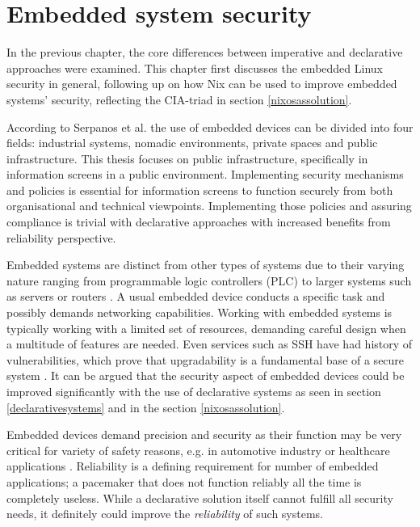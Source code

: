 \chapter{Embedded system security} \label{embedded}

In the previous chapter, the core differences between imperative and
declarative approaches were examined. This chapter first discusses
the embedded Linux security in general, following up on how Nix can be
used to improve embedded systems' security, reflecting the CIA-triad in section
\ref{nixosassolution}.

According to Serpanos et al. \cite{serpanos2013security} the use of embedded devices can be
divided into four fields: industrial systems, nomadic environments,
private spaces and public infrastructure. This thesis focuses on public
infrastructure, specifically in information screens in a public
environment. Implementing security mechanisms and policies is
essential for information screens to function securely from both
organisational and technical viewpoints. Implementing those policies
and assuring compliance is trivial with declarative approaches with
increased benefits from reliability perspective.

Embedded systems are distinct from other types of systems due to their
varying nature ranging from programmable logic controllers (PLC) to
larger systems such as servers or
routers \cite{fysarakis2014embedded}. A usual embedded device
conducts a specific task and possibly demands networking
capabilities. Working with embedded systems is typically working with a
limited set of resources, demanding careful design when a multitude of
features are needed. Even services such as SSH have
had history of vulnerabilities, which prove that upgradability is a
fundamental base of a secure system
\cite{secopsolutionHistorySecOps}. It can be argued that the security aspect of
embedded devices could be improved significantly with the use of
declarative systems as seen in section
\ref{declarativesystems} and in the section
\ref{nixosassolution}.

Embedded devices demand precision and security as their function may
be very critical for variety of safety reasons, e.g. in automotive
industry or healthcare applications \cite{turab2019secure, fysarakis2014embedded}. Reliability is a defining requirement for
number of embedded applications; a pacemaker that does not function reliably all
the time is completely useless. While a declarative solution
itself cannot fulfill all security needs, it definitely could improve
the \textit{reliability} of such systems.

